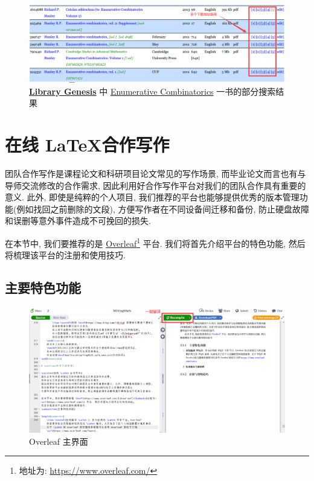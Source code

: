 \documentclass{formatBook}
\begin{document}
 \begin{figure}[H]
            \centering
            \includegraphics[width=\textwidth]{figure/ec.png}
            \caption{\textbf{\href{https://libgen.is/}{Library Genesis}} 中 \href{https://libgen.is/search.php?&req=Enumerative+Combinatorics&phrase=1&view=simple&column=def&sort=year&sortmode=DESC}{Enumerative Combinatorics} 一书的部分搜索结果}
            \label{fig:libgen}
        \end{figure}

\section{在线 \LaTeX 合作写作}
团队合作写作是课程论文和科研项目论文常见的写作场景, 而毕业论文而言也有与导师交流修改的合作需求, 因此利用好合作写作平台对我们的团队合作具有重要的意义. 此外, 即使是纯粹的个人项目, 我们推荐的平台也能够提供优秀的版本管理功能(例如找回之前删除的文段), 方便写作者在不同设备间迁移和备份, 防止硬盘故障和误删等意外事件造成不可挽回的损失.

在本节中, 我们要推荐的是 \href{https://www.overleaf.com/}{Overleaf}\footnote{地址为: \url{https://www.overleaf.com/}} 平台. 我们将首先介绍平台的特色功能, 然后将梳理该平台的注册和使用技巧.

\subsection{主要特色功能}
        \begin{figure}[H]
            \centering
            \includegraphics[width=\textwidth]{figure/overleafMain.png}
            \caption{Overleaf 主界面}
            \label{fig:overleafMain}
        \end{figure}
        
\end{document}
